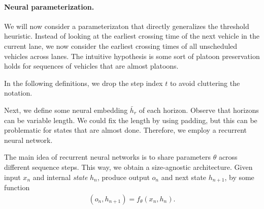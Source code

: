 \documentclass[a4paper]{report}
\theoremstyle{definition}
\theoremstyle{plain}
\newcommand\note[1]{{\color{Navy}#1}}
\begin{document}





\clearpage

\paragraph{Neural parameterization.}

We will now consider a parameterizaton that directly generalizes the
threshold heuristic. Instead of looking at the earliest crossing time of the
next vehicle in the current lane, we now consider the earliest crossing
times of all unscheduled vehicles across lanes.
%
The intuitive hypothesis is some sort of platoon preservation holds for
sequences of vehicles that are almost platoons.

\note{In the following definitions, we drop the step index $t$ to avoid
cluttering the notation.}

Next, we define some neural embedding $\bar{h}_{r}$ of each horizon. Observe
that horizons can be variable length. We could fix the length by using padding,
but this can be problematic for states that are almost done. Therefore, we
employ a recurrent neural network.

The main idea of recurrent neural networks is to share parameters $\theta$
across different sequence steps.
This way, we obtain a size-agnostic architecture.
%
Given input $x_n$ and internal \emph{state} $h_n$, produce output $o_n$ and next
state $h_{n+1}$, by some function
\begin{align}
  (o_{n}, h_{n+1}) = f_\theta(x_n, h_n) .
\end{align}
\end{document}
